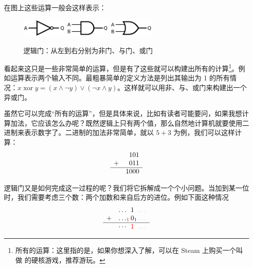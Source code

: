 在图上这些运算一般会这样表示：
\begin{figure}[H]
    \centering
    \includegraphics[width=0.2\textwidth]{img/not_gate.png}\quad
    \includegraphics[width=0.2\textwidth]{img/and_gate.png}\quad
    \includegraphics[width=0.2\textwidth]{img/or_gate.png}
    \caption{逻辑门：从左到右分别为非门、与门、或门}
\end{figure}

看起来这只是一些非常简单的运算，但是有了这些就可以构建出所有的计算\footnote{所有的运算：这里指的是，如果你想深入了解，可以在 Steam 上购买一个叫做  的硬核游戏，推荐游玩。}。例如运算表示两个输入不同。最粗暴简单的定义方法是列出其输出为 1 的所有情况：$x \; \text{xor} \; y = (x\land \neg y) \lor (\neg x \land y)$。这样就可以用非、与、或门来构建出一个异或门。

虽然它可以完成“所有的运算”，但是具体来说，比如有读者可能要问，如果我想计算加法，它应该怎么办呢？既然逻辑上只有两个值，那么自然地计算机就要使用二进制来表示数字了。二进制的加法非常简单，就以 $5+3$ 为例，我们可以这样计算：
\[
    \begin{array}{rr}
          & 101  \\
        + & 011  \\
        \hline
          & 1000
    \end{array}
\]

逻辑门又是如何完成这一过程的呢？我们将它拆解成一个个小问题。当加到某一位时，我们需要考虑三个数：两个加数和来自后方的进位。例如下面这种情况
\[
    \begin{array}{rr}
          & \ldots_{\phantom{0}} 1_{\phantom{0}} \color{lightgray}\ldots              \\
        + & \ldots_{\color{red}1} 0_{\color{blue}1} \color{lightgray}\ldots           \\
        \hline
          & \cdots_{\phantom{0}} {\color{red}1}_{\phantom{0}} \color{lightgray}\ldots
    \end{array}
\]

